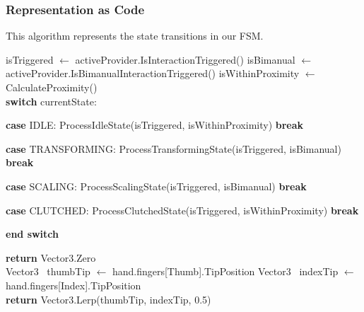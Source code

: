 
\subsubsection{Representation as Code}
\label{sec:fsm_switch_case}
This algorithm represents the state transitions in our FSM.
\vfill
\begin{algorithm}[htbp]
\caption{Finite State Machine dispatcher.}
\label{alg:fsm_core }
\begin{algorithmic}[1]
    \State isTriggered $\gets$ activeProvider.IsInteractionTriggered()
    \State isBimanual $\gets$ activeProvider.IsBimanualInteractionTriggered()
    \State isWithinProximity $\gets$ CalculateProximity()
    \\
    \State \textbf{switch} currentState:

    \State \quad \textbf{case} IDLE:
        \State \quad \qquad ProcessIdleState(isTriggered, isWithinProximity)
        \State \quad \qquad \textbf{break}

    \State \quad \textbf{case} TRANSFORMING:
        \State \quad \qquad ProcessTransformingState(isTriggered, isBimanual)
        \State \quad \qquad \textbf{break}

    \State \quad \textbf{case} SCALING:
        \State \quad \qquad ProcessScalingState(isTriggered, isBimanual)
        \State \quad \qquad \textbf{break}

    \State \quad \textbf{case} CLUTCHED:
        \State \quad \qquad ProcessClutchedState(isTriggered, isWithinProximity)
        \State \quad \qquad \textbf{break}

    \State \textbf{end switch}
\EndProcedure
\end{algorithmic}
\end{algorithm}
\vfill

\vfill
\begin{algorithm}[htbp]
\caption{Pinch detection based on captured hand tracking.}
\label{alg:get_pinch_formal}
\begin{algorithmic}[1]
        \State \textbf{return} Vector3.Zero
    \EndIf
    \\
    \State Vector3 \ thumbTip $\gets$ hand.fingers[Thumb].TipPosition
    \State Vector3 \ indexTip $\gets$ hand.fingers[Index].TipPosition
    \\
    \State \textbf{return} Vector3.Lerp(thumbTip, indexTip, 0.5)
\EndProcedure
\end{algorithmic}
\end{algorithm}


